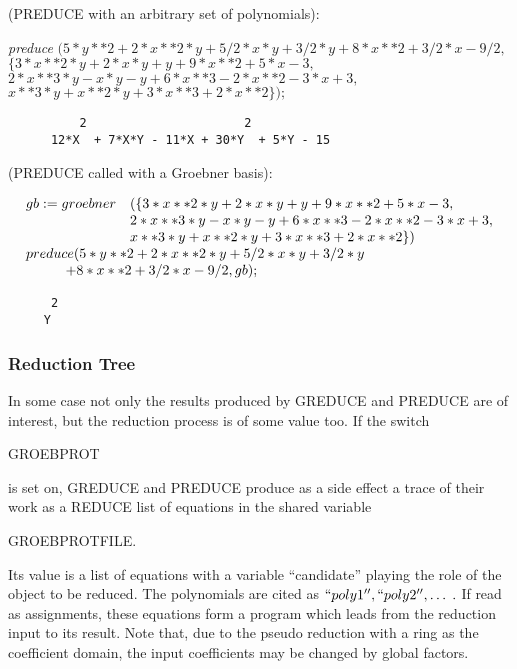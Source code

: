 \example (PREDUCE with an arbitrary set of polynomials):

{\it preduce} $ ( 5*y**2 + 2*x**2*y + 5/2*x*y + 3/2*y + 8*x**2 +
3/2*x - 9/2, $ \\ \hspace*{+1cm} $ \{ 3*x**2*y + 2*x*y + y + 9*x**2 +
5*x - 3, $ \\ \hspace*{+1cm} $ 2*x**3*y - x*y - y + 6*x**3 - 2*x**2 -
3*x + 3, $ \\ \hspace*{+1cm} $  x**3*y + x**2*y + 3*x**3 + 2*x**2 \});
$

\begin{verbatim}
          2                      2
      12*X  + 7*X*Y - 11*X + 30*Y  + 5*Y - 15
\end{verbatim}
\example (PREDUCE called with a Groebner basis):

\[
\begin{array}{ll}
 gb := groebner & ( \{ 3*x**2*y + 2*x*y + y + 9*x**2 + 5*x - 3, \\
& 2*x**3*y - x*y - y + 6*x**3 - 2*x**2 - 3*x + 3, \\
& x**3*y + x**2*y + 3*x**3 + 2*x**2 \}) \\
\multicolumn{2}{l}{preduce (5*y**2 + 2*x**2*y + 5/2*x*y + 3/2*y} \\
\multicolumn{2}{l}{\hspace*{+1cm}+ 8*x**2 + 3/2*x - 9/2, gb);}
\end{array}
\]
\begin{verbatim}
      2
     Y
\end{verbatim}

\subsubsection{Reduction Tree}
In some case not only the results produced by GREDUCE and
PREDUCE are of interest, but the reduction process is of some value
too. If the switch
\begin{center}
GROEBPROT
\end{center}
is set on, GREDUCE and PREDUCE produce as a side effect a trace of
their work as a REDUCE list of equations in the shared variable
\begin{center}
GROEBPROTFILE.
\end{center}
Its value is a list of equations with a variable ``candidate'' playing
the role of the object to be reduced. The polynomials are cited as
$``poly1'', ``poly2'', \ldots\;.$ If read as assignments, these equations
form a program which leads from the reduction input to its result.
Note that, due to the pseudo reduction with a ring as the coefficient
domain, the input coefficients may be changed by global factors.

